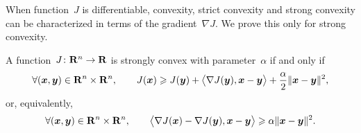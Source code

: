 When function~$J$ is differentiable,
convexity, strict convexity and strong convexity can be characterized in terms of the gradient~$\nabla J$.
We prove this only for strong convexity.
\begin{proposition}
    A function~$J\colon \mathbf R^n \to \mathbf R$ is strongly convex with parameter~$\alpha$ if and only if
    \begin{equation}
        \label{eq:strong_convex_eq1}
        \forall (\vect x, \vect y) \in \real^n \times \real^n,
        \qquad J(\vect x) \geq J(\vect y) + \ip[\big]{\nabla J(\vect y), \vect x - \vect y} + \frac{\alpha}{2} \norm{\vect x - \vect y}^2,
    \end{equation}
    or, equivalently,
    \begin{equation}
        \label{eq:strong_convex_eq2}
        \forall (\vect x, \vect y) \in \real^n \times \real^n,
        \qquad \ip[\big]{\nabla J(\vect x) - \nabla J(\vect y), \vect x - \vect y}
        \geq \alpha \norm{\vect x - \vect y}^2.
    \end{equation}
\end{proposition}
